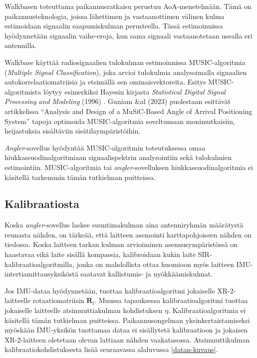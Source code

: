 \documentclass[
  12pt,
  a4paper, twoside]{book}
\begin{document}
Walkbasen toteuttama paikannusratkaisu perustuu AoA-menetelmään. Tämä on paikannusteknologia, joissa lähettimen ja vastaanottimen välinen kulma estimoidaan signaalin saapumiskulman perusteella. Tässä estimoinnissa hyödynnetään signaalin vaihe-eroja, kun sama signaali vastaanotetaan usealla eri antennilla.

Walkbase käyttää radiosignaalien tulokulman estimoinnissa MUSIC-algoritmia (\emph{Multiple Signal Classification}), joka arvioi tulokulmia analysoimalla signaalien autokorrelaatiomatriisia ja etsimällä sen ominaisvektoreita. Esitys MUSIC-algoritmista löytyy esimerkiksi Hayesin kirjasta \emph{Statistical Digital Signal Processing and Modeling} (1996) \citep{Hayes-1996}. Guniam \&al (2023) \citep{Gunia-2023} puolestaan esittävät artikkelissa ``Analysis and Design of a MuSiC-Based Angle of Arrival Positioning System'' tapoja optimoida MUSIC-algoritmia soveltumaan monimutkaisiin, heijastuksia sisältäviin sisätilaympäristöihin.

\emph{Angler}-sovellus hyödyntää MUSIC-algoritmin toteutuksessa omaa hiukkassuodinalgoritmiaan signaalispektrin analysointiin sekä tulokulmien estimointiin. MUSIC-algoritmia tai \emph{angler}-sovelluksen hiukkassuodinalgoritmia ei käsitellä tarkemmin tämän tutkielman puitteissa.

\subsection{Kalibraatiosta}

Koska \emph{angler}-sovellus laskee suuntimakulman aina antenniryhmän määrätystä reunasta nähden, on tärkeää, että laitteen asemointi karttapohjoiseen nähden on tiedossa. Koska laitteen tarkan kulman arvioiminen asennusympäristössä on haastavaa eikä laite sisällä kompassia, kalibroidaan kukin laite SIR-kalibraatioalgoritmilla, jonka on mahdollista ottaa huomioon myös laitteen IMU-intertiamittausyksiköstä saatavat kallistumis- ja nyökkäämiskulmat.

Jos IMU-dataa hyödynnetään, tuottaa kalibraatioalgoritmi jokaiselle XR-2-laitteelle rotaatiomatriisin \(\mathbf{R}_l\). Muussa tapauksessa kalibraatioalgoritmi tuottaa jokaiselle laitteelle atsimuuttiakulman kohdistuksen \(\eta\). Kalibraatioalgoritmia ei käsitellä tämän tutkielman puitteissa. Paikannusongelman yksinkertaistamiseksi myöskään IMU-yksikön tuottamaa dataa ei sisällytetä kalibraatioon ja jokaisen XR-2-laitteen oletetaan olevan lattiaan nähden vaakatasossa. Atsimuuttikulman kalibraatiokohdistuksesta lisää seuraavassa alaluvussa \ref{datan-kuvaus}.
\end{document}
